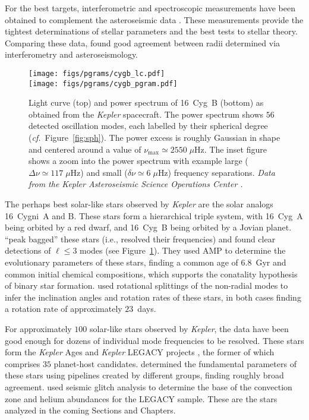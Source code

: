 For the best targets, interferometric and spectroscopic measurements have been obtained to complement the asteroseismic data \citep[e.g.,][]{2010MNRAS.405.1907B, 2012MNRAS.423..122B, 2012ApJ...749..152M, 2013MNRAS.433.1262W}. 
These measurements provide the tightest determinations of stellar parameters and the best tests to stellar theory. 
Comparing these data, \citet{2012ApJ...760...32H} found good agreement between radii determined via interferometry and asteroseismology. 
\begin{figure}
    \centering
    \texttt{[image: figs/pgrams/cygb\_lc.pdf]}\\
    \texttt{[image: figs/pgrams/cygb\_pgram.pdf]}
    \caption[Power spectrum of 16~Cyg~B]{
        Light curve (top) and power spectrum of 16~Cyg~B (bottom) as obtained from the \emph{Kepler} spacecraft. 
        The power spectrum shows $56$ detected oscillation modes, each labelled by their spherical degree (\emph{cf.}~Figure~\ref{fig:sph}). 
        The power excess is roughly Gaussian in shape and centered around a value of ${\nu_{\max}\simeq 2550 \;\mu\text{Hz}}$. 
        The inset figure shows a zoom into the power spectrum with example large (${\Delta\nu \simeq 117\;\mu\text{Hz}}$) and small (${\delta\nu \simeq 6\;\mu\text{Hz}}$) frequency separations. 
        \emph{Data from the Kepler Asteroseismic Science Operations Center \citep{KASOC}.}
    \label{fig:16cygb}}
\end{figure}


The perhaps best solar-like stars observed by \emph{Kepler} are the solar analogs 16~Cygni~A and B. 
These stars form a hierarchical triple system, with 16~Cyg~A being orbited by a red dwarf, and 16~Cyg~B being orbited by a Jovian planet.  %
\citet{2012ApJ...748L..10M} ``peak bagged'' these stars (i.e., resolved their frequencies) and found clear detections of ${\ell\leq 3}$ modes (see Figure~\ref{fig:16cygb}). 
They used AMP to determine the evolutionary parameters of these stars, finding a common age of $6.8$~Gyr and common initial chemical compositions, which supports the conatality hypothesis of binary star formation. 
\citet{2015MNRAS.446.2959D} used rotational splittings of the non-radial modes to infer the inclination angles and rotation rates of these stars, in both cases finding a rotation rate of approximately $23$~days. 


For approximately $100$ solar-like stars observed by \emph{Kepler}, the data have been good enough for dozens of individual mode frequencies to be resolved. 
These stars form the \emph{Kepler} Ages \citep{2016MNRAS.456.2183D} and \emph{Kepler} LEGACY projects \citep{2017ApJ...835..172L}, the former of which comprises $35$ planet-host candidates. 
\citet{2015MNRAS.452.2127S, 2017ApJ...835..173S} determined the fundamental parameters of these stars using pipelines created by different groups, finding roughly broad agreement. 
\citet{2014ApJ...790..138V, 2017ApJ...837...47V} used seismic glitch analysis to determine the base of the convection zone and helium abundances for the LEGACY sample.
These are the stars analyzed in the coming Sections and Chapters.  





